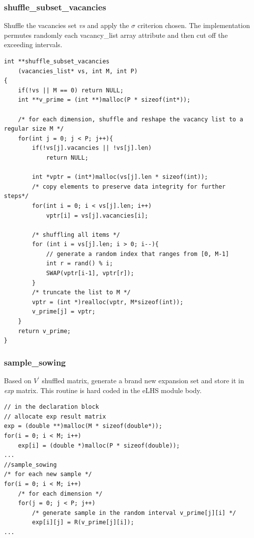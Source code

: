 \documentclass[12pt]{extarticle}
\begin{document}
\subsubsection{shuffle{\_}subset{\_}vacancies}
Shuffle the vacancies set \emph{vs} and apply the $\sigma$ criterion chosen. The implementation permutes randomly each vacancy{\_}list array attribute and then cut off the exceeding intervals. 

\begin{lstlisting}[style=CStyle]
int **shuffle_subset_vacancies
	(vacancies_list* vs, int M, int P)
{
    if(!vs || M == 0) return NULL;
    int **v_prime = (int **)malloc(P * sizeof(int*));

    /* for each dimension, shuffle and reshape the vacancy list to a regular size M */
    for(int j = 0; j < P; j++){
        if(!vs[j].vacancies || !vs[j].len)
            return NULL;

        int *vptr = (int*)malloc(vs[j].len * sizeof(int));
        /* copy elements to preserve data integrity for further steps*/
        for(int i = 0; i < vs[j].len; i++)
            vptr[i] = vs[j].vacancies[i];

        /* shuffling all items */
        for (int i = vs[j].len; i > 0; i--){ 
            // generate a random index that ranges from [0, M-1]
            int r = rand() % i;     
            SWAP(vptr[i-1], vptr[r]);
        }
        /* truncate the list to M */
        vptr = (int *)realloc(vptr, M*sizeof(int)); 
        v_prime[j] = vptr;
    }
    return v_prime;
}
\end{lstlisting}

\subsubsection{sample{\_}sowing}
Based on $V^\prime$ shuffled matrix, generate a brand new expansion set and store it in \emph{exp} matrix. This routine is hard coded in the eLHS module body. 

\begin{lstlisting}[style=CStyle]
// in the declaration block
// allocate exp result matrix 
exp = (double **)malloc(M * sizeof(double*));
for(i = 0; i < M; i++)
	exp[i] = (double *)malloc(P * sizeof(double));
...
//sample_sowing
/* for each new sample */
for(i = 0; i < M; i++)
	/* for each dimension */
	for(j = 0; j < P; j++)
		/* generate sample in the random interval v_prime[j][i] */
		exp[i][j] = R(v_prime[j][i]);
...	
\end{lstlisting}
\end{document}
